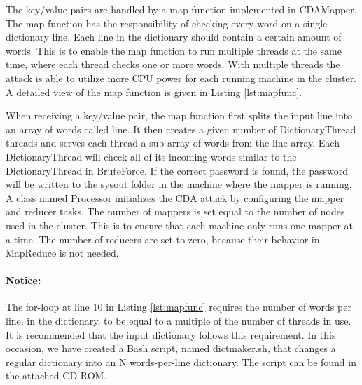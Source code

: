 \documentclass[pdftex,english,10pt,b5paper,twoside]{book}
\begin{document}
\noindent The key/value pairs are handled by a map function implemented in CDAMapper. The map function has the
responsibility of checking every word on a single dictionary line. Each line in
the dictionary should contain a certain amount of words. This is to enable the
map function to run multiple threads at the same time, where each thread checks
one or more words. With multiple threads the attack is able to utilize more CPU power
for each running machine in the cluster. A detailed view of the map function is
given in Listing \ref{lst:mapfunc}. 



When receiving a key/value pair, the map function first splits the input line
into an array of words called line. It then creates a given number of
DictionaryThread threads and serves each thread a sub array of words from the
line array. Each DictionaryThread will check all of its incoming words similar
to the DictionaryThread in BruteForce. If the correct password is found, the
password will be written to the sysout folder in the machine where the mapper is
running.\\

\noindent A class named Processor initializes the CDA attack by configuring the mapper and
reducer tasks. The number of mappers is set equal to the number of nodes
used in the cluster. This is to ensure that each machine only runs one mapper at
a time. The number of reducers are set to zero, because their behavior in
MapReduce is not needed.


\paragraph{Notice:} The for-loop at line 10 in Listing \ref{lst:mapfunc} requires the number of words
per line, in the dictionary, to be equal to a multiple of the number of threads in use. It is
recommended that the input dictionary follows this requirement. In this
occasion, we have created a Bash script, named dictmaker.sh, that changes a regular dictionary into
an N words-per-line dictionary. The script can be found in the attached CD-ROM.
 
\end{document}
